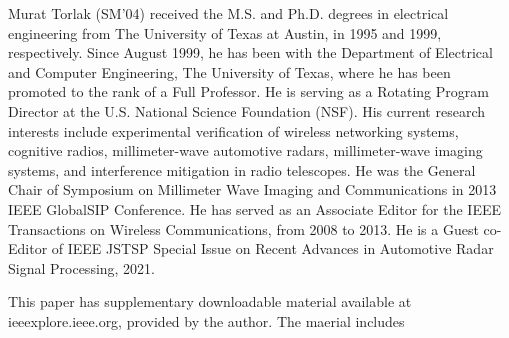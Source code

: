 \documentclass[10pt,journal,final]{IEEEtran}
\begin{document}
\begin{IEEEbiography}{Murat Torlak} (SM’04) received the M.S. and Ph.D. degrees in electrical engineering from The University of Texas at Austin, in 1995 and 1999, respectively. Since August 1999, he has been with the Department of Electrical and Computer Engineering, The University of Texas, where he has been promoted to the rank of a Full Professor. He is serving as a Rotating Program Director at the U.S. National Science Foundation (NSF). His current research interests include experimental verification of wireless networking systems, cognitive radios, millimeter-wave automotive radars, millimeter-wave imaging systems, and interference mitigation in radio telescopes. He was the General Chair of Symposium on Millimeter Wave Imaging and Communications in 2013 IEEE GlobalSIP Conference. He has served as an Associate Editor for the IEEE Transactions on Wireless Communications, from 2008 to 2013. He is a Guest co-Editor of IEEE JSTSP Special Issue on Recent Advances in Automotive Radar Signal Processing, 2021.
\end{IEEEbiography}

This paper has supplementary downloadable material available at ieeexplore.ieee.org, provided by the author.
The maerial includes 
\end{document}
